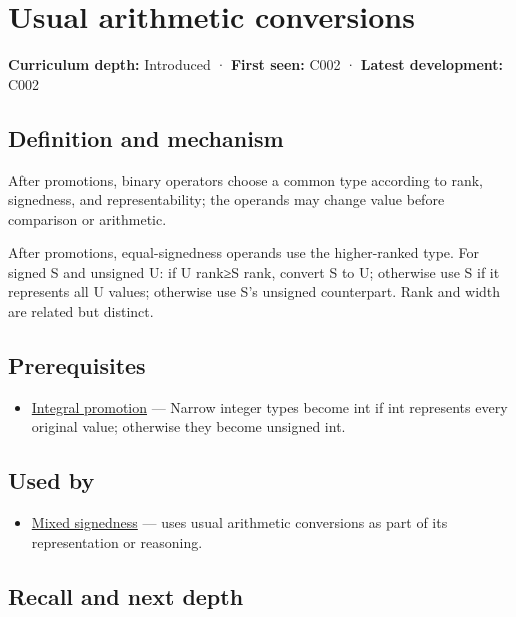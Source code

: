 \hypertarget{appendix-5e2d663adf7f}{}
\section{Usual arithmetic conversions}\label{appendix-5e2d663adf7f-usual-arithmetic-conversions}

\textbf{Curriculum depth:} Introduced · \textbf{First seen:} C002 · \textbf{Latest development:} C002

\subsection{Definition and mechanism}\label{appendix-5e2d663adf7f-definition-and-mechanism}

After promotions, binary operators choose a common type according to rank, signedness, and representability; the operands may change value before comparison or arithmetic.

After promotions, equal-signedness operands use the higher-ranked type. For signed S and unsigned U: if U rank≥S rank, convert S to U; otherwise use S if it represents all U values; otherwise use S's unsigned counterpart. Rank and width are related but distinct.

\subsection{Prerequisites}\label{appendix-5e2d663adf7f-prerequisites}

\begin{itemize}
\tightlist
\item
  \hyperref[appendix-45303d03796a]{Integral promotion} --- Narrow integer types become int if int represents every original value; otherwise they become unsigned int.
\end{itemize}

\subsection{Used by}\label{appendix-5e2d663adf7f-used-by}

\begin{itemize}
\tightlist
\item
  \hyperref[appendix-736a2345de4a]{Mixed signedness} --- uses usual arithmetic conversions as part of its representation or reasoning.
\end{itemize}

\subsection{Recall and next depth}\label{appendix-5e2d663adf7f-recall-and-next-depth}

